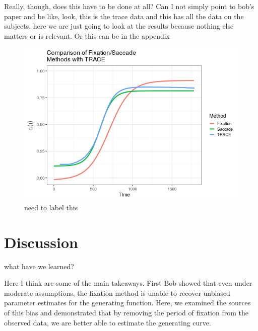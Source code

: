 \documentclass{article}
\begin{document}
Really, though, does this have to be done at all? Can I not simply point to bob's paper and be like, look, this is the trace data and this has all the data on the subjects. here we are just going to look at the results because nothing else matters or is relevant. Or this can be in the appendix


\begin{figure}
\centering
\includegraphics[width=\textwidth]{sac_fix_trace_compare.png}
\caption{need to label this}
\end{figure}

\section{Discussion}

what have we learned?

Here I think are some of the main takeaways. First Bob showed that even under moderate assumptions, the fixation method is unable to recover unbiased parameter estimates for the generating function. Here, we examined the sources of this bias and demonstrated that by removing the period of fixation from the observed data, we are better able to estimate the generating curve. 
\end{document}
